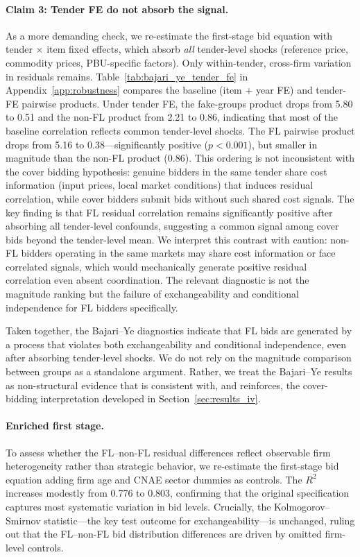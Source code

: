 \paragraph{Claim 3: Tender FE do not absorb the signal.}
As a more demanding check, we re-estimate the first-stage bid equation
with tender $\times$ item fixed effects, which absorb \emph{all}
tender-level shocks (reference price, commodity prices, PBU-specific
factors). Only within-tender, cross-firm variation in residuals remains.
Table~\ref{tab:bajari_ye_tender_fe} in Appendix~\ref{app:robustness}
compares the baseline (item + year FE) and tender-FE pairwise products.
Under tender FE, the fake-groups product drops from 5.80 to 0.51 and
the non-FL product from 2.21 to 0.86, indicating that most of the
baseline correlation reflects common tender-level shocks. The FL pairwise
product drops from 5.16 to 0.38---significantly positive ($p < 0.001$),
but smaller in magnitude than the non-FL product (0.86). This ordering
is not inconsistent with the cover bidding hypothesis: genuine bidders
in the same tender share cost information (input prices, local market
conditions) that induces residual correlation, while cover bidders
submit bids without such shared cost signals. The key finding is that FL
residual correlation remains significantly positive after absorbing all
tender-level confounds, suggesting a common signal among cover bids
beyond the tender-level mean. We interpret this contrast with caution:
non-FL bidders operating in the same markets may share cost information
or face correlated signals, which would mechanically generate positive
residual correlation even absent coordination. The relevant diagnostic is
not the magnitude ranking but the failure of exchangeability and
conditional independence for FL bidders specifically.

Taken together, the Bajari--Ye diagnostics indicate that FL bids are
generated by a process that violates both exchangeability and conditional
independence, even after absorbing tender-level shocks. We do not rely on
the magnitude comparison between groups as a standalone argument. Rather,
we treat the Bajari--Ye results as non-structural evidence that is
consistent with, and reinforces, the cover-bidding interpretation
developed in Section~\ref{sec:results_iv}.

\paragraph{Enriched first stage.} %
To assess whether the FL--non-FL residual differences reflect observable
firm heterogeneity rather than strategic behavior, we re-estimate the
first-stage bid equation adding firm age and CNAE sector dummies as
controls. The $R^2$ increases modestly from 0.776 to 0.803, confirming
that the original specification captures most systematic variation in bid
levels. Crucially, the Kolmogorov--Smirnov statistic---the key test
outcome for exchangeability---is unchanged, ruling out that the FL--non-FL
bid distribution differences are driven by omitted firm-level controls.

